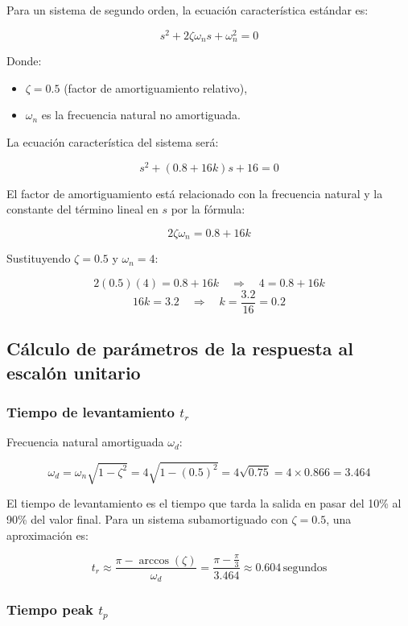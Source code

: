 \documentclass[10pt]{article}
\theoremstyle{definition}
\theoremstyle{remark}
\theoremstyle{definition}
\numberwithin{equation}{prob}
\begin{document}
Para un sistema de segundo orden, la ecuación característica estándar es:

\[
	s^2 + 2\zeta \omega_n s + \omega_n^2 = 0
\]

Donde:
\begin{itemize}
	\item \(\zeta = 0.5\) (factor de amortiguamiento relativo),
	\item \(\omega_n\) es la frecuencia natural no amortiguada.
\end{itemize}

La ecuación característica del sistema será:

\[
	s^2 + (0.8 + 16k)s + 16 = 0
\]

El factor de amortiguamiento está relacionado con la frecuencia natural y la constante del término lineal en \(s\) por la fórmula:

\[
	2\zeta \omega_n = 0.8 + 16k
\]

Sustituyendo \(\zeta = 0.5\) y \(\omega_n = 4\):

\[
	2(0.5)(4) = 0.8 + 16k \quad \Rightarrow \quad 4 = 0.8 + 16k
\]
\[
	16k = 3.2 \quad \Rightarrow \quad k = \frac{3.2}{16} = 0.2
\]

\subsection{Cálculo de parámetros de la respuesta al escalón unitario}

\subsubsection{Tiempo de levantamiento \texorpdfstring{\(t_r\)}{tr}}

Frecuencia natural amortiguada \(\omega_d\):

\[
	\omega_d = \omega_n \sqrt{1 - \zeta^2} = 4 \sqrt{1 - (0.5)^2} = 4 \sqrt{0.75} = 4 \times 0.866 = 3.464
\]

El tiempo de levantamiento es el tiempo que tarda la salida en pasar del 10\% al 90\% del valor final. Para un sistema subamortiguado con \(\zeta = 0.5\), una aproximación es:

\[
	t_r \approx \frac{\pi - \arccos(\zeta)}{\omega_d} = \frac{\pi - \frac{\pi}{3}}{3.464} \approx 0.604 \, \text{segundos}
\]

\subsubsection{Tiempo peak \texorpdfstring{\(t_p\)}{tp}}
\end{document}
